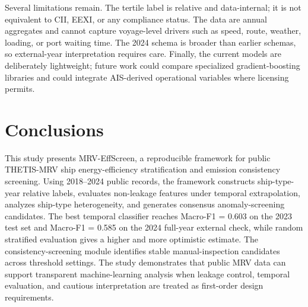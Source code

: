 \documentclass[jmse,article,submit,pdftex,oneauthor]{Definitions/mdpi}
\begin{document}
Several limitations remain. The tertile label is relative and data-internal; it is not equivalent to CII, EEXI, or any compliance status. The data are annual aggregates and cannot capture voyage-level drivers such as speed, route, weather, loading, or port waiting time. The 2024 schema is broader than earlier schemas, so external-year interpretation requires care. Finally, the current models are deliberately lightweight; future work could compare specialized gradient-boosting libraries and could integrate AIS-derived operational variables where licensing permits.

\section{Conclusions}

This study presents MRV-EffScreen, a reproducible framework for public THETIS-MRV ship energy-efficiency stratification and emission consistency screening. Using 2018--2024 public records, the framework constructs ship-type-year relative labels, evaluates non-leakage features under temporal extrapolation, analyzes ship-type heterogeneity, and generates consensus anomaly-screening candidates. The best temporal classifier reaches Macro-F1 = 0.603 on the 2023 test set and Macro-F1 = 0.585 on the 2024 full-year external check, while random stratified evaluation gives a higher and more optimistic estimate. The consistency-screening module identifies stable manual-inspection candidates across threshold settings. The study demonstrates that public MRV data can support transparent machine-learning analysis when leakage control, temporal evaluation, and cautious interpretation are treated as first-order design requirements.

\vspace{6pt}





\end{document}
